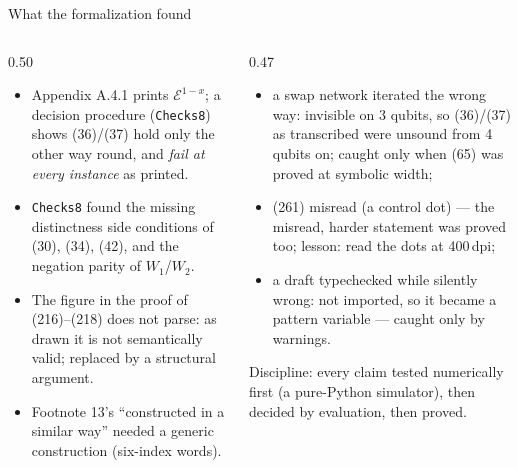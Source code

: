 \begin{frame}{What the formalization found \New}
\begin{columns}[T]
\begin{column}{0.50\textwidth}
\begin{keybox}[title=In the paper]
\footnotesize
\begin{itemize}
  \setlength{\itemsep}{2pt}
  \item Appendix A.4.1 prints $\mathcal{E}^{1-x}$; a decision procedure
        (\texttt{Checks8}) shows (36)/(37) hold only the other way round, and
        \emph{fail at every instance} as printed.
  \item \texttt{Checks8} found the \alert{missing distinctness side conditions}
        of (30), (34), (42), and the negation parity of $W_1$/$W_2$.
  \item The figure in the proof of (216)--(218) does not parse: as drawn it is
        \alert{not semantically valid}; replaced by a structural argument.
  \item Footnote 13's ``constructed in a similar way'' needed a generic
        construction (six-index words).
\end{itemize}
\end{keybox}
\end{column}
\begin{column}{0.47\textwidth}
\begin{newdevbox}[title=In our own transcription]
\footnotesize
\begin{itemize}
  \setlength{\itemsep}{2pt}
  \item a swap network iterated the wrong way: invisible on 3 qubits, so (36)/(37)
        as transcribed were \alert{unsound from 4 qubits on}; caught only when
        (65) was proved at symbolic width;
  \item (261) misread (a control dot) --- the misread, harder statement was
        proved too; lesson: read the dots at 400\,dpi;
  \item a draft typechecked while silently wrong:  not imported, so
        it became a pattern variable --- caught only by warnings.
\end{itemize}
\end{newdevbox}
\vspace{4pt}
\begin{keybox}
\small Discipline: every claim tested numerically first (a pure-Python
simulator), then decided by evaluation, then proved.
\end{keybox}
\end{column}
\end{columns}
\end{frame}

